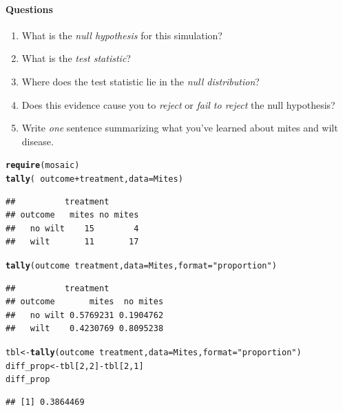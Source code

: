 \documentclass[10pt]{article}\usepackage[]{graphicx}\usepackage[]{color}
\makeatletter
\newcommand{\hlnum}[1]{\textcolor[rgb]{0.686,0.059,0.569}{#1}}%
\newcommand{\hlstr}[1]{\textcolor[rgb]{0.192,0.494,0.8}{#1}}%
\newcommand{\hlopt}[1]{\textcolor[rgb]{0,0,0}{#1}}%
\newcommand{\hlstd}[1]{\textcolor[rgb]{0.345,0.345,0.345}{#1}}%
\newcommand{\hlkwb}[1]{\textcolor[rgb]{0.69,0.353,0.396}{#1}}%
\newcommand{\hlkwc}[1]{\textcolor[rgb]{0.333,0.667,0.333}{#1}}%
\newcommand{\hlkwd}[1]{\textcolor[rgb]{0.737,0.353,0.396}{\textbf{#1}}}%
\newenvironment{kframe}{%
 \def\at@end@of@kframe{}%
 \ifinner\ifhmode%
  \def\at@end@of@kframe{\end{minipage}}%
  \begin{minipage}{\columnwidth}%
 \fi\fi%
 \def\FrameCommand##1{\hskip\@totalleftmargin \hskip-\fboxsep
 \colorbox{shadecolor}{##1}\hskip-\fboxsep
     \hskip-\linewidth \hskip-\@totalleftmargin \hskip\columnwidth}%
 \MakeFramed {\advance\hsize-\width
   \@totalleftmargin\z@ \linewidth\hsize
   \@setminipage}}%
 {\par\unskip\endMakeFramed%
 \at@end@of@kframe}
\newenvironment{knitrout}{}{} %
\makeatother
\begin{document}
\paragraph{Questions}
\begin{enumerate}
  \itemsep0.75in
  \item What is the \emph{null hypothesis} for this simulation?
  \item What is the \emph{test statistic}?
  \item Where does the test statistic lie in the \emph{null distribution}?
  \item Does this evidence cause you to \emph{reject} or \emph{fail to reject} the null hypothesis?
  \item Write \emph{one} sentence summarizing what you've learned about mites and wilt disease.  
  \vspace{0.5in}
\end{enumerate}

\begin{knitrout}\footnotesize
{}\color{fgcolor}\begin{kframe}
\begin{alltt}
\hlkwd{require}\hlstd{(mosaic)}
\hlkwd{tally}\hlstd{(}\hlopt{~} \hlstd{outcome} \hlopt{+} \hlstd{treatment,} \hlkwc{data} \hlstd{= Mites)}
\end{alltt}
\begin{verbatim}
##          treatment
## outcome   mites no mites
##   no wilt    15        4
##   wilt       11       17
\end{verbatim}
\begin{alltt}
\hlkwd{tally}\hlstd{(outcome} \hlopt{~} \hlstd{treatment,} \hlkwc{data} \hlstd{= Mites,} \hlkwc{format} \hlstd{=} \hlstr{"proportion"}\hlstd{)}
\end{alltt}
\begin{verbatim}
##          treatment
## outcome       mites  no mites
##   no wilt 0.5769231 0.1904762
##   wilt    0.4230769 0.8095238
\end{verbatim}
\end{kframe}
\end{knitrout}

\begin{knitrout}\footnotesize
{}\color{fgcolor}\begin{kframe}
\begin{alltt}
\hlstd{tbl} \hlkwb{<-} \hlkwd{tally}\hlstd{(outcome} \hlopt{~} \hlstd{treatment,} \hlkwc{data} \hlstd{= Mites,} \hlkwc{format} \hlstd{=} \hlstr{"proportion"}\hlstd{)}
\hlstd{diff_prop} \hlkwb{<-} \hlstd{tbl[}\hlnum{2}\hlstd{,}\hlnum{2}\hlstd{]} \hlopt{-} \hlstd{tbl[}\hlnum{2}\hlstd{,}\hlnum{1}\hlstd{]}
\hlstd{diff_prop}
\end{alltt}
\begin{verbatim}
## [1] 0.3864469
\end{verbatim}
\end{kframe}
\end{knitrout}
\end{document}
